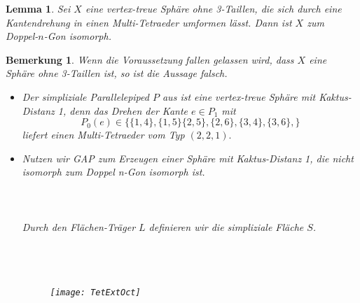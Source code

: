 \documentclass[12pt,titlepage,twoside,cleardoublepage]{article}
\theoremstyle{nummermitklammern}
\newtheorem{lemma}[temp]{Lemma}
\newtheorem{bemerkung}[temp]{Bemerkung}
\newtheorem{lemma}[zahl]{Lemma}
\newtheorem{bemerkung}[zahl]{Bemerkung}
\numberwithin{equation}{section}
\begin{document}
\begin{lemma}
Sei $X$ eine vertex-treue Sphäre ohne 3-Taillen, die  sich durch eine Kantendrehung in einen Multi-Tetraeder umformen lässt. Dann ist $X$  zum Doppel-$n$-Gon isomorph.
\end{lemma}
\begin{bemerkung}
Wenn die Voraussetzung fallen gelassen wird, dass $X$ eine Sphäre ohne 3-Taillen ist, so ist die Aussage falsch. 
\begin{itemize}
\item Der simpliziale Parallelepiped $P$ aus  ist eine vertex-treue Sphäre mit Kaktus-Distanz 1, denn das Drehen der Kante $e\in P_1$ mit 
\[
P_0(e)\in\{\{1,4\},\{1,5\}\{2,5\},\{2,6\},\{3,4\},\{3,6\},\}
\] liefert einen Multi-Tetraeder vom Typ $(2,2,1).$
\item Nutzen wir GAP zum Erzeugen einer Sphäre mit Kaktus-Distanz 1, die nicht isomorph zum Doppel n-Gon isomorph ist. \\\\
\fbox{
\parbox{13.4cm}{
\textcolor{red}{$gap>$} \textcolor{blue}{$L:=[[ 2, 3, 5 ], [ 2, 4, 5 ], [ 3, 4, 5 ], [ 1, 3, 6 ], [ 1, 4, 6 ], 
  [ 3, 4, 6 ], [ 1, 7, 8 ], [ 1, 4, 7 ],\newline [ 2, 4, 7 ], [ 2, 7, 8 ], [ 1, 3, 8 ], [ 2, 3, 8 ] ];;$}
  }}\\\\
  Durch den Flächen-Träger $L$ definieren wir die simpliziale Fläche $S$.\\\\
  \\\\
\begin{figure}[H]
\begin{center}
\texttt{[image: TetExtOct]}
\end{center}

\end{figure}
\end{itemize}
\end{bemerkung}
\end{document}
